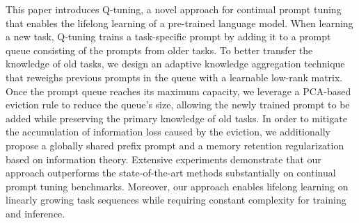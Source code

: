 This paper introduces Q-tuning, a novel approach for continual prompt tuning that enables the lifelong learning of a pre-trained language model. When learning a new task, Q-tuning trains a task-specific prompt by adding it to a prompt queue consisting of the prompts from older tasks. To better transfer the knowledge of old tasks, we design an adaptive knowledge aggregation technique that reweighs previous prompts in the queue with a learnable low-rank matrix. Once the prompt queue reaches its maximum capacity, we leverage a PCA-based eviction rule to reduce the queue's size, allowing the newly trained prompt to be added while preserving the primary knowledge of old tasks. In order to mitigate the accumulation of information loss caused by the eviction, we additionally propose a globally shared prefix prompt and a memory retention regularization based on information theory. Extensive experiments demonstrate that our approach outperforms the state-of-the-art methods substantially on continual prompt tuning benchmarks. Moreover, our approach enables lifelong learning on linearly growing task sequences while requiring constant complexity for training and inference.